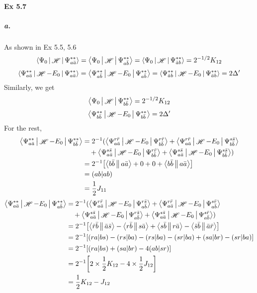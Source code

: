 \documentclass[a4paper]{article}
\DeclareMathOperator{\sH}{\mathscr{H}}
\newcommand{\ex}[1]{\paragraph{Ex #1}}
\newcommand{\subex}[1]{\subparagraph{#1}}
\numberwithin{equation}{subsection}
\begin{document}
\ex{5.7}
\subex{a.}
As shown in Ex 5.5, 5.6
\begin{align}
\Braket{\Psi_0 | \sH | \Psi_{a\bar{a}}^{**}} 
= \Braket{\Psi_0 | \sH | \Psi_{a\bar{b}}^{**}} 
= \Braket{\Psi_0 | \sH | \Psi_{\bar{a}b}^{**}} = 2^{-1/2}K_{12}
\end{align}
\begin{align}
\Braket{\Psi_{a\bar{a}}^{**} | \sH - E_0 | \Psi_{a\bar{a}}^{**}} 
= \Braket{\Psi_{a\bar{b}}^{**} | \sH - E_0 | \Psi_{a\bar{b}}^{**}} 
= \Braket{\Psi_{\bar{a}b}^{**} | \sH - E_0 | \Psi_{\bar{a}b}^{**}} = 2\Delta' 
\end{align}
Similarly, we get
\begin{align}
\Braket{\Psi_0 | \sH | \Psi_{b\bar{b}}^{**}} = 2^{-1/2}K_{12}
\end{align}
\begin{align}
\Braket{\Psi_{b\bar{b}}^{**} | \sH - E_0 | \Psi_{b\bar{b}}^{**}} 
 = 2\Delta' 
\end{align}
For the rest, 
\begin{align}
\Braket{\Psi_{a\bar{a}}^{**} | \sH - E_0 | \Psi_{b\bar{b}}^{**}} 
&= 2^{-1} (\Braket{\Psi_{a\bar{a}}^{r\bar{r}} | \sH - E_0 | \Psi_{b\bar{b}}^{r\bar{r}}} 
+ \Braket{\Psi_{a\bar{a}}^{r\bar{r}} | \sH - E_0 | \Psi_{b\bar{b}}^{s\bar{s}}} \notag\\
&{}\quad
+ \Braket{\Psi_{a\bar{a}}^{s\bar{s}} | \sH - E_0 | \Psi_{b\bar{b}}^{r\bar{r}}} 
+ \Braket{\Psi_{a\bar{a}}^{s\bar{s}} | \sH - E_0 | \Psi_{b\bar{b}}^{s\bar{s}}}) \notag\\
&= 2^{-1} \qty[ 
\Braket{b\bar{b} || a\bar{a}} 
+ 0 + 0 + \Braket{b\bar{b} || a\bar{a}}
] \notag\\
&= (ab|ab) \notag\\
&= \dfrac{1}{2}J_{11}
\end{align}
\begin{align}
\Braket{\Psi_{a\bar{a}}^{**} | \sH - E_0 | \Psi_{a\bar{b}}^{**}} 
&= 2^{-1} (\Braket{\Psi_{a\bar{a}}^{r\bar{r}} | \sH - E_0 | \Psi_{a\bar{b}}^{r\bar{s}}} 
+ \Braket{\Psi_{a\bar{a}}^{r\bar{r}} | \sH - E_0 | \Psi_{a\bar{b}}^{s\bar{r}}} \notag\\
&{}\quad
+ \Braket{\Psi_{a\bar{a}}^{s\bar{s}} | \sH - E_0 | \Psi_{a\bar{b}}^{r\bar{s}}} 
+ \Braket{\Psi_{a\bar{a}}^{s\bar{s}} | \sH - E_0 | \Psi_{a\bar{b}}^{s\bar{r}}}) \notag\\
&= 2^{-1} \qty[ 
\Braket{\bar{r}\bar{b} || \bar{a}\bar{s}} 
- \Braket{r\bar{b} || s\bar{a}} + \Braket{s\bar{b} || r\bar{a}} - \Braket{\bar{s}\bar{b} || \bar{a}\bar{r}}
] \notag\\
&= 2^{-1}[(ra|bs) - (rs|ba) - (rs|ba) - (sr|ba) + (sa|br) - (sr|ba) ] \notag\\
&= 2^{-1}[(ra|bs) + (sa|br) - 4(ab|sr) ] \notag\\
&= 2^{-1}\qty[2\times \dfrac{1}{2}K_{12} - 4\times \dfrac{1}{2}J_{12}] \notag\\
&= \dfrac{1}{2} K_{12} - J_{12}
\end{align}
\end{document}
